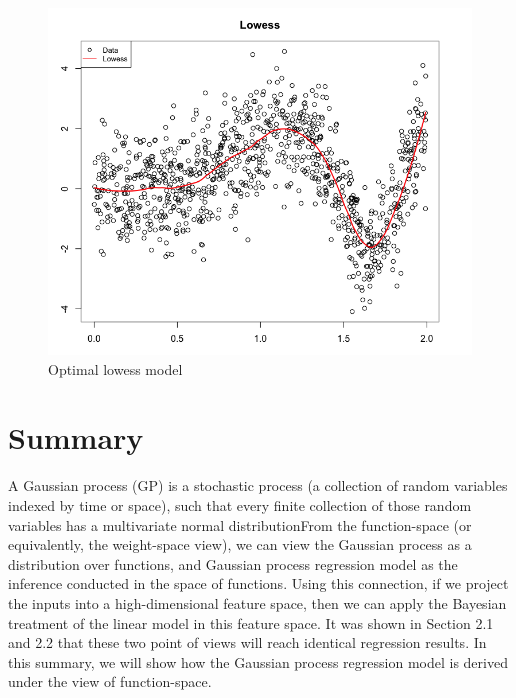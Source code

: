 \documentclass[12pt]{article}
\begin{document}
\begin{figure}
\begin{center}
\caption{Optimal lowess model}
\includegraphics[scale=0.5]{lowess}
\end{center}
\end{figure}

\section{Summary}
A Gaussian process (GP) is a stochastic process (a collection of random variables indexed by time or space), such that every finite collection of those random variables has a multivariate normal distributionFrom the function-space (or equivalently, the weight-space view), we can view the Gaussian process as a distribution over functions, and Gaussian process regression model as the inference conducted in the space of functions. Using this connection, if we project the inputs into a high-dimensional feature space, then we can apply the Bayesian treatment of the linear model in this feature space. It was shown in Section 2.1 and 2.2 that these two point of views will reach identical regression results. In this summary, we will show how the Gaussian process regression model is derived under the view of function-space.
\end{document}

